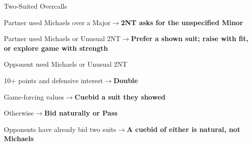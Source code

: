 \documentclass[10pt,letterpaper]{article}
\begin{document}
\begin{minipage}[t]{0.485\textwidth}
\begin{guidecard}{Two-Suited Overcalls}
\begin{branches}
\item Partner used Michaels over a Major\;\ensuremath{\longrightarrow}\;\textbf{2NT asks for the unspecified Minor}
\item Partner used Michaels or Unusual 2NT\;\ensuremath{\longrightarrow}\;\textbf{Prefer a shown suit; raise with fit, or explore game with strength}
\item Opponent used Michaels or Unusual 2NT
\begin{branches}
\item 10+ points and defensive interest\;\ensuremath{\longrightarrow}\;\textbf{Double}
\item Game-forcing values\;\ensuremath{\longrightarrow}\;\textbf{Cuebid a suit they showed}
\item Otherwise\;\ensuremath{\longrightarrow}\;\textbf{Bid naturally or Pass}
\end{branches}
\item Opponents have already bid two suits\;\ensuremath{\longrightarrow}\;\textbf{A cuebid of either is natural, not Michaels}
\end{branches}
\end{guidecard}

\end{minipage}
\end{document}
